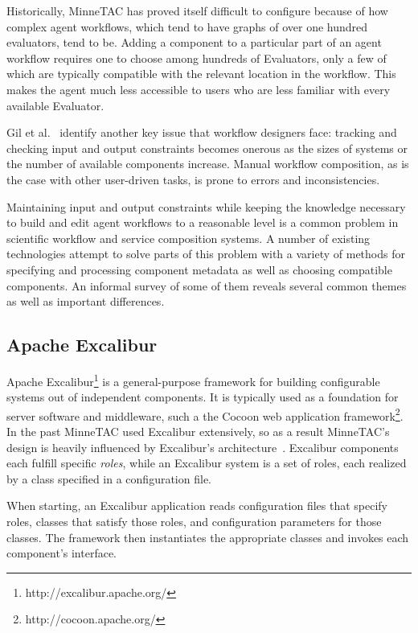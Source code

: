 \documentclass{article}
\begin{document}
Historically, MinneTAC has proved itself difficult to configure because of how complex agent workflows, which tend to have graphs of over one hundred evaluators, tend to be.
Adding a component to a particular part of an agent workflow requires one to choose among hundreds of Evaluators, only a few of which are typically compatible with the relevant location in the workflow.
This makes the agent much less accessible to users who are less familiar with every available Evaluator.

Gil et al.~\cite{gil2010wings} identify another key issue that workflow designers face:  tracking and checking input and output constraints becomes onerous as the sizes of systems or the number of available components increase.
Manual workflow composition, as is the case with other user-driven tasks, is prone to errors and inconsistencies.

Maintaining input and output constraints while keeping the knowledge necessary to build and edit agent workflows to a reasonable level is a common problem in scientific workflow and service composition systems.
A number of existing technologies attempt to solve parts of this problem with a variety of methods for specifying and processing component metadata as well as choosing compatible components.
An informal survey of some of them reveals several common themes as well as important differences.

\subsection{Apache Excalibur}

Apache Excalibur\footnote{http://excalibur.apache.org/} is a general-purpose framework for building configurable systems out of independent components.
It is typically used as a foundation for server software and middleware, such a the Cocoon web application framework\footnote{http://cocoon.apache.org/}.
In the past MinneTAC used Excalibur extensively, so as a result MinneTAC's design is heavily influenced by Excalibur's architecture~\cite{Collins08ECRA}.
Excalibur components each fulfill specific \emph{roles}, while an Excalibur system is a set of roles, each realized by a class specified in a configuration file.

When starting, an Excalibur application reads configuration files that specify roles, classes that satisfy those roles, and configuration parameters for those classes.
The framework then instantiates the appropriate classes and invokes each component's interface.
\end{document}
